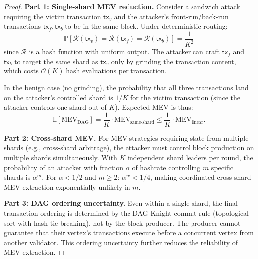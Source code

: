 \documentclass[11pt,a4paper]{article}
\theoremstyle{definition}
\theoremstyle{remark}
\newcommand{\bigO}{\mathcal{O}}
\newcommand{\expect}{\mathbb{E}}
\newcommand{\prob}{\mathbb{P}}
\begin{document}
\begin{proof}
\textbf{Part 1: Single-shard MEV reduction.}
Consider a sandwich attack requiring the victim transaction
$\mathsf{tx}_v$ and the attacker's front-run/back-run transactions
$\mathsf{tx}_f, \mathsf{tx}_b$ to be in the same block.
Under deterministic routing:
\[
  \prob[\mathcal{R}(\mathsf{tx}_v) = \mathcal{R}(\mathsf{tx}_f) =
  \mathcal{R}(\mathsf{tx}_b)] = \frac{1}{K^2}
\]
since $\mathcal{R}$ is a hash function with uniform output.
The attacker can craft $\mathsf{tx}_f$ and $\mathsf{tx}_b$ to target
the same shard as $\mathsf{tx}_v$ only by grinding the transaction
content, which costs $\bigO(K)$ hash evaluations per transaction.

In the benign case (no grinding), the probability that all three
transactions land on the attacker's controlled shard is $1/K$ for the
victim transaction (since the attacker controls one shard out of $K$).
Expected MEV is thus:
\[
  \expect[\mathrm{MEV}_{\text{DAG}}] = \frac{1}{K} \cdot
  \mathrm{MEV}_{\text{same-shard}} \leq \frac{1}{K} \cdot
  \mathrm{MEV}_{\text{linear}}.
\]

\textbf{Part 2: Cross-shard MEV.}
For MEV strategies requiring state from multiple shards (e.g., cross-shard
arbitrage), the attacker must control block production on multiple shards
simultaneously.
With $K$ independent shard leaders per round, the probability of an
attacker with fraction $\alpha$ of hashrate controlling $m$ specific
shards is $\alpha^m$.
For $\alpha < 1/2$ and $m \geq 2$: $\alpha^m < 1/4$, making
coordinated cross-shard MEV extraction exponentially unlikely in $m$.

\textbf{Part 3: DAG ordering uncertainty.}
Even within a single shard, the final transaction ordering is determined
by the DAG-Knight commit rule (topological sort with hash tie-breaking),
not by the block producer.
The producer cannot guarantee that their vertex's transactions execute
before a concurrent vertex from another validator.
This ordering uncertainty further reduces the reliability of MEV extraction.
\end{proof}
\end{document}
